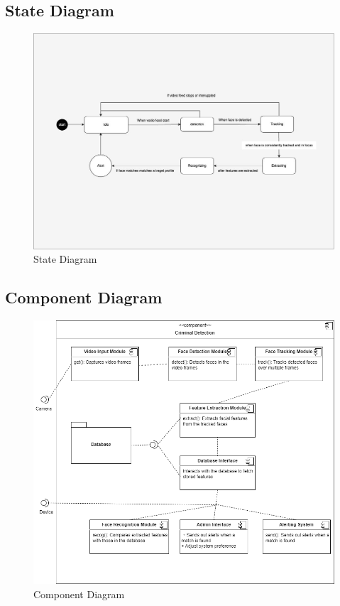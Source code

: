 	\pagebreak

	\subsection{State Diagram}
		\begin{figure}[h!]
			\includegraphics[width=\textwidth]{components/images/state.jpeg}
			\caption{State Diagram}
			\label{fig:state}
		\end{figure}

	\pagebreak

	\subsection{Component Diagram}
		\begin{figure}[h!]
			\includegraphics[width=\textwidth]{components/images/component.png}
			\caption{Component Diagram}
			\label{fig:component}
		\end{figure}

